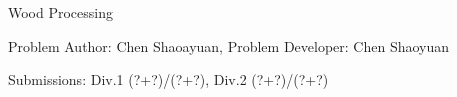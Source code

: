 \begin{Solution}{Wood Processing}

\begin{frame}{\ProblemName}

\small Problem Author: Chen Shaoayuan, Problem Developer: Chen Shaoyuan \par \vspace{0.3cm}

\small Submissions: Div.1 (?+?)/(?+?), Div.2 (?+?)/(?+?)  \par \vspace{0.5cm}

\end{frame}

\end{Solution}

